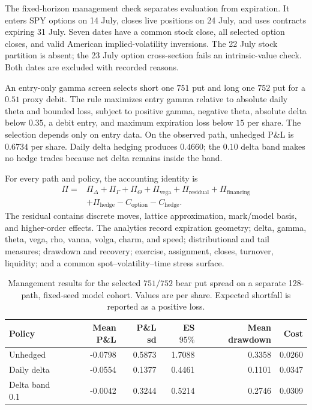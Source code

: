 \documentclass{strategynet-journal}
\begin{document}
The fixed-horizon management check separates evaluation from expiration.
It enters SPY options on 14 July, closes live positions on 24 July, and uses
contracts expiring 31 July.  Seven dates have a common stock close, all
selected option closes, and valid American implied-volatility inversions.
The 22 July stock partition is absent; the 23 July option cross-section fails
an intrinsic-value check.  Both dates are excluded with recorded reasons.

An entry-only gamma screen selects short one \(751\) put and long one \(752\)
put for a \(0.51\) proxy debit.  The rule maximizes entry gamma relative to
absolute daily theta and bounded loss, subject to positive gamma, negative
theta, absolute delta below \(0.35\), a debit entry, and maximum expiration
loss below \(15\) per share.  The selection depends only on entry data.  On
the observed path, unhedged P\&L is \(0.6734\) per share.  Daily delta hedging produces
\(0.4660\); the \(0.10\) delta band makes no hedge trades because net delta
remains inside the band.

For every path and policy, the accounting identity is
\[
\begin{split}
\Pi={}&\Pi_{\Delta}+\Pi_{\Gamma}+\Pi_{\Theta}+\Pi_{\mathrm{vega}}
       +\Pi_{\mathrm{residual}}+\Pi_{\mathrm{financing}}\\
     &+\Pi_{\mathrm{hedge}}-C_{\mathrm{option}}-C_{\mathrm{hedge}} .
\end{split}
\]
The residual contains discrete moves, lattice approximation, mark/model basis,
and higher-order effects.  The analytics record expiration geometry; delta,
gamma, theta, vega, rho, vanna, volga,
charm, and speed; distributional and tail measures; drawdown and recovery;
exercise, assignment, closes, turnover, liquidity; and a common
spot--volatility--time stress surface.

\begin{table}[H]
\centering
\caption{Management results for the selected \(751/752\) bear put spread on a
separate 128-path, fixed-seed model cohort.  Values are per share.  Expected
shortfall is reported as a positive loss.}
\label{tab:management-policy}
\begin{tabular}{lrrrrr}
\toprule
Policy & Mean P\&L & P\&L sd & ES \(95\%\) & Mean drawdown & Cost \\
\midrule
Unhedged       & -0.0798 & 0.5873 & 1.7088 & 0.3358 & 0.0260 \\
Daily delta    & -0.0554 & 0.1377 & 0.4461 & 0.1101 & 0.0347 \\
Delta band 0.1 & -0.0042 & 0.3244 & 0.5214 & 0.2746 & 0.0309 \\
\bottomrule
\end{tabular}
\end{table}
\end{document}
